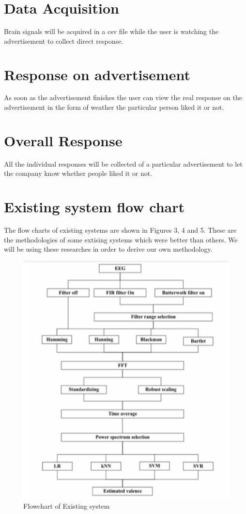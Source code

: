 \documentclass[a4paper, 12pt, oneside]{uet_thesis}
\begin{document}
\section{Data Acquisition}
Brain signals will be acquired in a csv file while the user is watching the advertisement to collect direct response.
\section{Response on advertisement}
As soon as the advertisement finishes the user can view the real response on the advertisement in the form of weather the particular person liked it or not.
\section{Overall Response}
All the individual responses will be collected of a particular advertisement to let the company know whether people liked it or not.
\section{Existing system flow chart}
The flow charts of existing systems are shown in Figures 3, 4 and 5. These are the methodologies of some extising systems which were better than others. We will be using these researches in order to derive our own methodology.
\begin{figure}[htbp]
\centerline{\includegraphics[scale=0.8]{Existing1.png}}
\caption{Flowchart of Existing system  \cite{b1}}
\label{Table4}
\end{figure}
\end{document}
